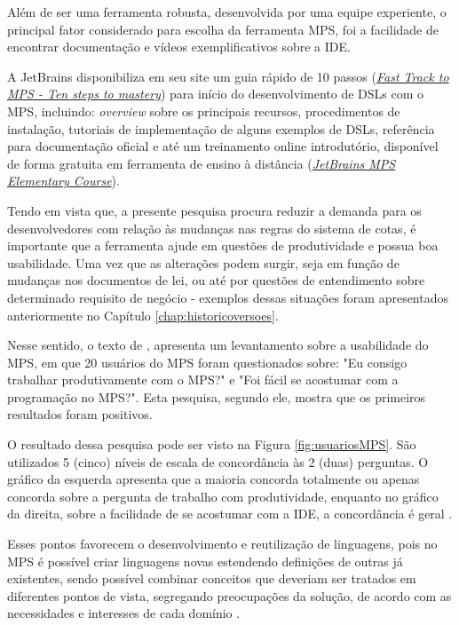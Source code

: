 Além de ser uma ferramenta robusta, desenvolvida por uma equipe experiente, o principal fator considerado para escolha da ferramenta \gls{MPS}, foi a facilidade de encontrar documentação e vídeos exemplificativos sobre a \gls{IDE}. 

A JetBrains disponibiliza em seu site um guia rápido de 10 passos (\href{www.jetbrains.com/help/mps/fast-track-to-mps.html}{\textit{Fast Track to MPS - Ten steps to mastery}}) para início do desenvolvimento de \gls{DSL}s com o \gls{MPS}, incluindo: \textit{overview} sobre os principais recursos, procedimentos de instalação, tutoriais de implementação de alguns exemplos de \gls{DSL}s, referência para documentação oficial e até um treinamento online introdutório, disponível de forma gratuita em ferramenta de ensino à distância (\href{https://stepik.org/course/37360/promo}{\textit{JetBrains MPS Elementary Course}}).  

Tendo em vista que, a presente pesquisa procura reduzir a demanda para os desenvolvedores com relação às mudanças nas regras do sistema de cotas, é importante que a ferramenta ajude em questões de produtividade e possua boa usabilidade. Uma vez que as alterações podem surgir, seja em função de mudanças nos documentos de lei, ou até por questões de entendimento sobre determinado requisito de negócio - exemplos dessas situações foram apresentados anteriormente no Capítulo \ref{chap:historicoversoes}.

Nesse sentido, o texto de  , apresenta um levantamento sobre a usabilidade do \gls{MPS}, em que 20 usuários do \gls{MPS} foram questionados sobre: "Eu consigo trabalhar produtivamente com o MPS?" e "Foi fácil se acostumar com a programação no MPS?". Esta pesquisa, segundo ele, mostra que os primeiros resultados foram positivos. 

O resultado dessa pesquisa pode ser visto na Figura \ref{fig:usuariosMPS}. São utilizados 5 (cinco) níveis de escala de concordância às 2 (duas) perguntas. O gráfico da esquerda apresenta que a maioria concorda totalmente ou apenas concorda sobre a pergunta de trabalho com produtividade, enquanto no gráfico da direita, sobre a facilidade de se acostumar com a \gls{IDE}, a concordância é geral \cite{voelter2014generic}.






Esses pontos favorecem o desenvolvimento e reutilização de linguagens, pois no \gls{MPS} é possível criar linguagens novas estendendo definições de outras já existentes, sendo possível combinar conceitos que deveriam ser tratados em diferentes pontos de vista, segregando preocupações da solução, de acordo com as necessidades e interesses de cada domínio \cite{volter2011language}.


